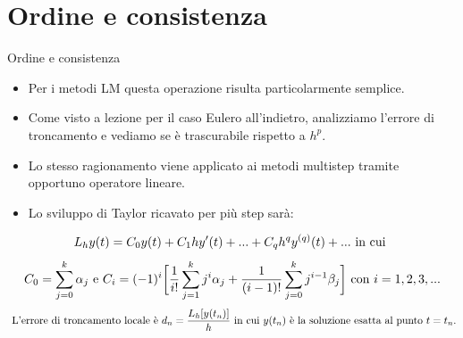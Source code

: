 \documentclass[aspectratio=169, 10pt, handout,usenames,dvipsnames]{beamer}
\begin{document}
\section{Ordine e consistenza}\label{sec:sec8}
    \begin{frame}{Ordine e consistenza }
        \begin{itemize}
            \item Per i metodi LM questa operazione risulta particolarmente semplice.
        \end{itemize}
        \begin{itemize}
            \item Come visto a lezione per il caso Eulero all'indietro, analizziamo l'errore di troncamento e vediamo se è trascurabile rispetto a $h^p$.
            \item Lo stesso ragionamento viene applicato ai metodi multistep tramite opportuno operatore lineare. 
            \item Lo sviluppo di Taylor ricavato per più step sarà: 
        \end{itemize}
        
          \[L_{h}y(t) = C_0y(t) + C_1hy'(t) + ... + C_qh^qy^{(q)}(t) + ...   \textnormal{ in cui }\]
          \[ C_0 = \displaystyle\sum_{j=0}^k \alpha_j \textnormal{ e }  C_i = (-1)^i \biggl[{1 \over i!}\displaystyle\sum_{j=1}^k j^i\alpha_j  + {1 \over (i - 1)!} \displaystyle\sum_{j=0}^k j^{i-1}\beta_j\biggl] \textnormal{ con } i = 1, 2, 3, ...\]
          \[ \textnormal{ L'errore di troncamento locale è } d_n = {L_h[y(t_n)] \over h} \textnormal{ in cui  } y(t_n) \textnormal{ è la soluzione esatta al punto } t = t_n .\]
    \end{frame}
\end{document}
